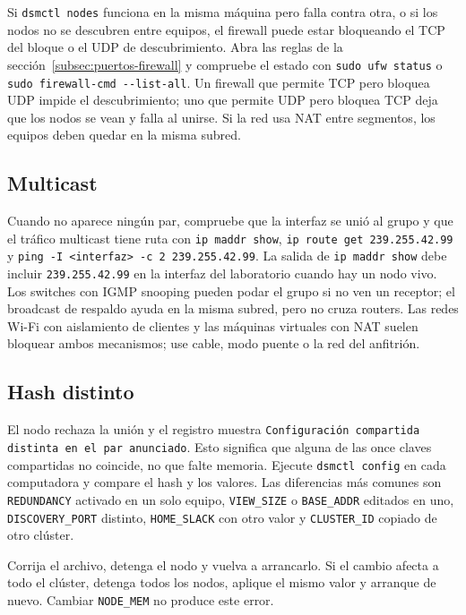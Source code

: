 Si \texttt{dsmctl nodes} funciona en la misma máquina pero falla contra otra, o si los nodos no se descubren entre equipos, el firewall puede estar bloqueando el TCP del bloque o el UDP de descubrimiento. Abra las reglas de la sección~\ref{subsec:puertos-firewall} y compruebe el estado con \texttt{sudo ufw status} o \texttt{sudo firewall-cmd -{}-list-all}. Un firewall que permite TCP pero bloquea UDP impide el descubrimiento; uno que permite UDP pero bloquea TCP deja que los nodos se vean y falla al unirse. Si la red usa NAT entre segmentos, los equipos deben quedar en la misma subred.

\subsection{Multicast}\label{subsec:multicast}

Cuando no aparece ningún par, compruebe que la interfaz se unió al grupo y que el tráfico multicast tiene ruta con \texttt{ip maddr show}, \texttt{ip route get 239.255.42.99} y \texttt{ping -I <interfaz> -c 2 239.255.42.99}. La salida de \texttt{ip maddr show} debe incluir \texttt{239.255.42.99} en la interfaz del laboratorio cuando hay un nodo vivo. Los switches con IGMP snooping pueden podar el grupo si no ven un receptor; el broadcast de respaldo ayuda en la misma subred, pero no cruza routers. Las redes Wi-Fi con aislamiento de clientes y las máquinas virtuales con NAT suelen bloquear ambos mecanismos; use cable, modo puente o la red del anfitrión.

\subsection{Hash distinto}\label{subsec:hash-distinto}

El nodo rechaza la unión y el registro muestra \texttt{Configuración compartida distinta en el par anunciado}. Esto significa que alguna de las once claves compartidas no coincide, no que falte memoria. Ejecute \texttt{dsmctl config} en cada computadora y compare el hash y los valores. Las diferencias más comunes son \texttt{REDUNDANCY} activado en un solo equipo, \texttt{VIEW\_SIZE} o \texttt{BASE\_ADDR} editados en uno, \texttt{DISCOVERY\_PORT} distinto, \texttt{HOME\_SLACK} con otro valor y \texttt{CLUSTER\_ID} copiado de otro clúster.

Corrija el archivo, detenga el nodo y vuelva a arrancarlo. Si el cambio afecta a todo el clúster, detenga todos los nodos, aplique el mismo valor y arranque de nuevo. Cambiar \texttt{NODE\_MEM} no produce este error.


